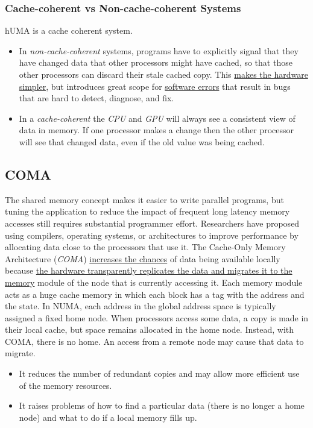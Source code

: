 \documentclass[12pt]{article}
\numberwithin{equation}{section}
\numberwithin{table}{section}
\numberwithin{figure}{section}
\begin{document}
\subsubsection*{Cache-coherent vs Non-cache-coherent Systems}
hUMA is a cache coherent system.
\begin{itemize}
	\item In \textit{non-cache-coherent} systems, programs have to explicitly signal that they have changed data that other processors might have cached, so that those other processors can discard their stale cached copy. This \underline{makes the hardware simpler}, but introduces great scope for \underline{software errors} that result in bugs that are hard to detect, diagnose, and fix.
	
	\item
	In a \textit{cache-coherent} the \textit{CPU} and \textit{GPU} will always see a consistent view of data in memory. If one processor makes a change then the other processor will see that changed data, even if the old value was being cached.\cite{hUMA}
\end{itemize}

\subsection*{COMA}
The shared memory concept makes it easier to write parallel programs, but tuning the application to reduce the impact of frequent long latency memory accesses still requires substantial programmer effort. Researchers have proposed using compilers, operating systems, or architectures to improve performance by allocating data close to the processors that use it. The Cache-Only Memory Architecture (\textit{COMA}) \underline{increases the chances} of data being available locally because \underline{the hardware transparently replicates the data and migrates it to the memory} module of the node that is currently accessing it. Each memory module acts as a huge cache memory in which each block has a tag with the address and the state.\cite{COMA}
In NUMA, each address in the global address space is typically assigned a fixed home node. When processors access some data, a copy is made in their local cache, but space remains allocated in the home node. Instead, with COMA, there is no home. An access from a remote node may cause that data to migrate.
\begin{itemize}
	\item It reduces the number of redundant copies and may allow more efficient use of the memory resources.
	
	\item It raises problems of how to find a particular data (there is no longer a home node) and what to do if a local memory fills up.
\end{itemize}
\end{document}
